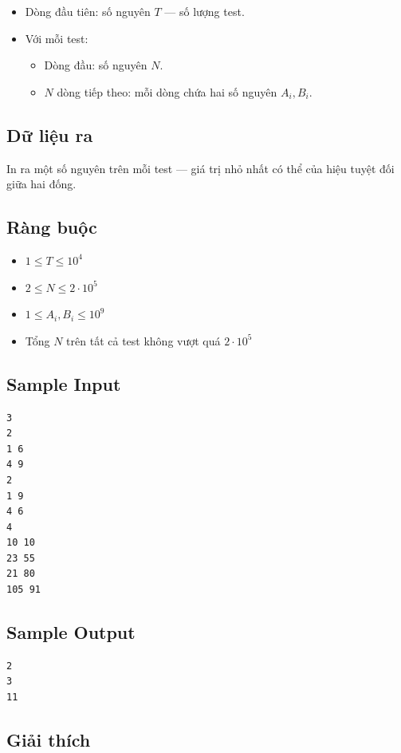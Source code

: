 \begin{itemize}
    \item Dòng đầu tiên: số nguyên $T$ — số lượng test.
    \item Với mỗi test:
    \begin{itemize}
        \item Dòng đầu: số nguyên $N$.
        \item $N$ dòng tiếp theo: mỗi dòng chứa hai số nguyên $A_i, B_i$.
    \end{itemize}
\end{itemize}

\subsection*{Dữ liệu ra}

In ra một số nguyên trên mỗi test — giá trị nhỏ nhất có thể của hiệu tuyệt đối giữa hai đống.

\subsection*{Ràng buộc}

\begin{itemize}
    \item $1 \le T \le 10^{4}$
    \item $2 \le N \le 2 \cdot 10^{5}$
    \item $1 \le A_i, B_i \le 10^{9}$
    \item Tổng $N$ trên tất cả test không vượt quá $2 \cdot 10^5$
\end{itemize}

\subsection*{Sample Input}

\begin{verbatim}
3
2
1 6
4 9
2
1 9
4 6
4
10 10
23 55
21 80
105 91
\end{verbatim}

\subsection*{Sample Output}

\begin{verbatim}
2
3
11
\end{verbatim}

\subsection*{Giải thích}

